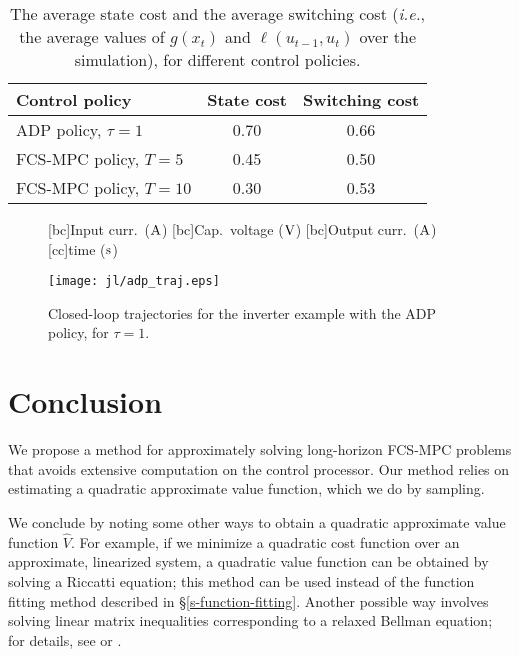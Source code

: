 \documentclass[12pt]{article}
\newcommand{\ie}{{\it i.e.}}
\newif\ifarxiv
\begin{document}
\begin{table}
\begin{center}
\begin{tabular}{lcc}
{\bf Control policy}             & {\bf State cost}   & {\bf Switching cost}   \\
\hline \hline                                                                 
ADP policy, $\tau = 1$           & 0.70               & 0.66        \\
FCS-MPC policy, $T = 5$          & 0.45               & 0.50        \\
FCS-MPC policy, $T = 10$         & 0.30               & 0.53        \\
\hline
\end{tabular}
\end{center}
\caption{
The average state cost and the average switching cost 
(\ie, the average values of $g(x_t)$ and $\ell(u_{t-1}, u_t)$
over the simulation),
for different control policies.
}
\label{t-inverter}
\end{table}






\begin{figure}
\centering
{}[bc]{Input curr.\ ($\rm A$)}
[bc]{Cap.\ voltage ($\rm V$)}
[bc]{Output curr.\ ($\rm A$)}
[cc]{time ($\rm s$)}
\ifarxiv
\texttt{[image: adp\_traj.eps]}
\else
\texttt{[image: jl/adp\_traj.eps]}
\fi
\caption{
Closed-loop trajectories for the inverter example with the ADP policy,
for $\tau = 1$.
}
\label{f-inverter-traj-adp}
\end{figure}
















\section{Conclusion}
\label{s-conclucion}
We propose a method for approximately solving long-horizon FCS-MPC
problems that avoids extensive computation on the control processor.
Our method relies on estimating a quadratic approximate value function,
which we do by sampling.

We conclude by noting some other ways to obtain 
a quadratic approximate value function $\hat V$.
For example, if we minimize a quadratic cost function
over an approximate, linearized system,
a quadratic value function can be obtained by solving a Riccatti equation;
this method can be used instead of the function fitting method described in 
\S\ref{s-function-fitting}.
Another possible way involves solving linear matrix inequalities
corresponding to a relaxed Bellman equation;
for details, see \cite{rantzer2006relaxed} or \cite{wang2015approximate}.
\end{document}
